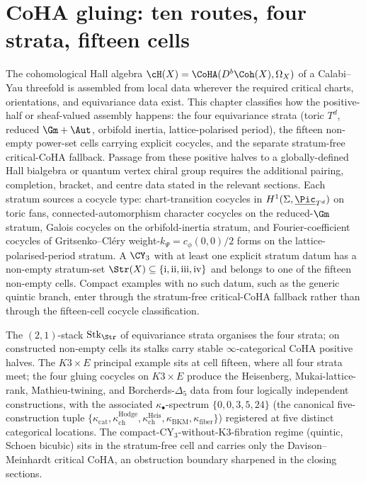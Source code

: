 \chapter{CoHA gluing: ten routes, four strata, fifteen cells}
\label{ch:gluing}

The cohomological Hall algebra $\cH(X) = \CoHA(D^b\Coh(X), \Omega_X)$ of
a Calabi--Yau threefold is assembled from local data wherever the
required critical charts, orientations, and equivariance data exist.
This chapter classifies how the positive-half or sheaf-valued assembly
happens: the four equivariance strata (toric $T^d$, reduced
$\Gm + \Aut$, orbifold inertia, lattice-polarised period), the fifteen
non-empty power-set cells carrying explicit cocycles, and the separate
stratum-free critical-CoHA fallback. Passage from these positive halves
to a globally-defined Hall bialgebra or quantum vertex chiral group
requires the additional pairing, completion, bracket, and centre data
stated in the relevant sections.
Each stratum sources a cocycle type: chart-transition cocycles in
$H^1(\Sigma, \underline{\Pic}_{T^d})$ on toric fans, connected-automorphism
character cocycles on the reduced-$\Gm$ stratum, Galois cocycles on the
orbifold-inertia stratum, and Fourier-coefficient cocycles of
Gritsenko--Cl\'ery weight-$k_\Psi = c_\phi(0, 0)/2$ forms on the
lattice-polarised-period stratum. A $\CY_3$ with at least one explicit
stratum datum has a non-empty stratum-set
\(\Str(X) \subseteq \{\mathrm{i}, \mathrm{ii}, \mathrm{iii}, \mathrm{iv}\}\)
and belongs to one of the fifteen non-empty cells. Compact examples with
no such datum, such as the generic quintic branch, enter through the
stratum-free critical-CoHA fallback rather than through the fifteen-cell
cocycle classification.

The $(2,1)$-stack $\mathrm{Stk}_{\Str}$ of equivariance strata
organises the four strata; on constructed non-empty cells its stalks
carry stable $\infty$-categorical CoHA positive halves. The
$K3 \times E$ principal example sits at cell fifteen, where all four
strata meet; the four gluing cocycles on $K3 \times E$ produce the
Heisenberg, Mukai-lattice-rank, Mathieu-twining, and Borcherds-$\Delta_5$
data from four logically independent constructions, with the associated
$\kappa_\bullet$-spectrum $\{0, 0, 3, 5, 24\}$ (the canonical five-construction
tuple $\{\kappa_{\mathrm{cat}}, \kappa_{\mathrm{ch}}^{\mathrm{Hodge}},
\kappa_{\mathrm{ch}}^{\mathrm{Heis}}, \kappa_{\mathrm{BKM}}, \kappa_{\mathrm{fiber}}\}$)
registered at five distinct categorical locations. The compact-CY$_3$-without-K3-fibration regime
(quintic, Schoen bicubic) sits in the stratum-free cell and carries only
the Davison--Meinhardt critical CoHA, an obstruction boundary sharpened
in the closing sections.

